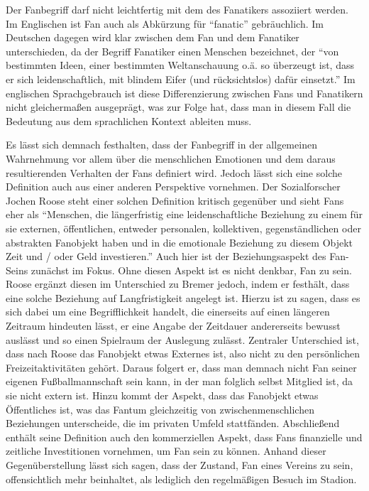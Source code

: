 Der Fanbegriff darf nicht leichtfertig mit dem des Fanatikers assoziiert werden.
Im Englischen ist Fan auch als Abkürzung für "`fanatic"' gebräuchlich.
Im Deutschen dagegen wird klar zwischen dem Fan und dem Fanatiker unterschieden, da der Begriff Fanatiker einen Menschen bezeichnet, der "`von bestimmten Ideen, einer bestimmten Weltanschauung o.ä. so überzeugt ist, dass er sich leidenschaftlich, mit blindem Eifer (und rücksichtslos) dafür einsetzt."'
Im englischen Sprachgebrauch ist diese Differenzierung zwischen Fans und Fanatikern nicht gleichermaßen ausgeprägt, was zur Folge hat, dass man in diesem Fall die Bedeutung aus dem sprachlichen Kontext ableiten muss.

Es lässt sich demnach festhalten, dass der Fanbegriff in der allgemeinen Wahrnehmung vor allem über die menschlichen Emotionen und dem daraus resultierenden Verhalten der Fans definiert wird.
Jedoch lässt sich eine solche Definition auch aus einer anderen Perspektive vornehmen.
Der Sozialforscher Jochen Roose steht einer solchen Definition kritisch gegenüber und sieht Fans eher als "`Menschen, die längerfristig eine leidenschaftliche Beziehung zu einem für sie externen, öffentlichen, entweder personalen, kollektiven, gegenständlichen oder abstrakten Fanobjekt haben und in die emotionale Beziehung zu diesem Objekt Zeit und / oder Geld investieren."'
Auch hier ist der Beziehungsaspekt des Fan-Seins zunächst im Fokus.
Ohne diesen Aspekt ist es nicht denkbar, Fan zu sein.
Roose ergänzt diesen im Unterschied zu Bremer jedoch, indem er festhält, dass eine solche Beziehung auf Langfristigkeit angelegt ist.
Hierzu ist zu sagen, dass es sich dabei um eine Begrifflichkeit handelt, die einerseits auf einen längeren Zeitraum hindeuten lässt, er eine Angabe der Zeitdauer andererseits bewusst auslässt und so einen Spielraum der Auslegung zulässt.
Zentraler Unterschied ist, dass nach Roose das Fanobjekt etwas Externes ist, also nicht zu den persönlichen Freizeitaktivitäten gehört.
Daraus folgert er, dass man demnach nicht Fan seiner eigenen Fußballmannschaft sein kann, in der man folglich selbst Mitglied ist, da sie nicht extern ist.
Hinzu kommt der Aspekt, dass das Fanobjekt etwas Öffentliches ist, was das Fantum gleichzeitig von zwischenmenschlichen Beziehungen unterscheide, die im privaten Umfeld stattfänden.
Abschließend enthält seine Definition auch den kommerziellen Aspekt, dass Fans finanzielle und zeitliche Investitionen vornehmen, um Fan sein zu können.
Anhand dieser Gegenüberstellung lässt sich sagen, dass der Zustand, Fan eines Vereins zu sein, offensichtlich mehr beinhaltet, als lediglich den regelmäßigen Besuch im Stadion.

